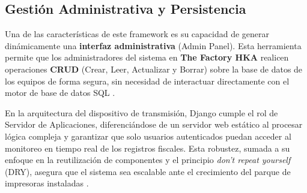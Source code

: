 \subsection{Gesti\'on Administrativa y Persistencia}

\par Una de las caracter\'isticas de este framework es su capacidad de generar din\'amicamente una \textbf{interfaz administrativa} (Admin Panel). Esta herramienta permite que los administradores del sistema en \textbf{The Factory HKA} realicen operaciones \textbf{CRUD} (Crear, Leer, Actualizar y Borrar) sobre la base de datos de los equipos de forma segura, sin necesidad de interactuar directamente con el motor de base de datos SQL \cite{Django_v5_Doc}.\\

\par En la arquitectura del dispositivo de transmisión, Django cumple el rol de Servidor de Aplicaciones, diferenci\'andose de un servidor web est\'atico al procesar l\'ogica compleja y garantizar que solo usuarios autenticados puedan acceder al monitoreo en tiempo real de los registros fiscales. Esta robustez, sumada a su enfoque en la reutilizaci\'on de componentes y el principio \textit{don't repeat yourself} (DRY), asegura que el sistema sea escalable ante el crecimiento del parque de impresoras instaladas \cite{Django_v5_Doc}.
